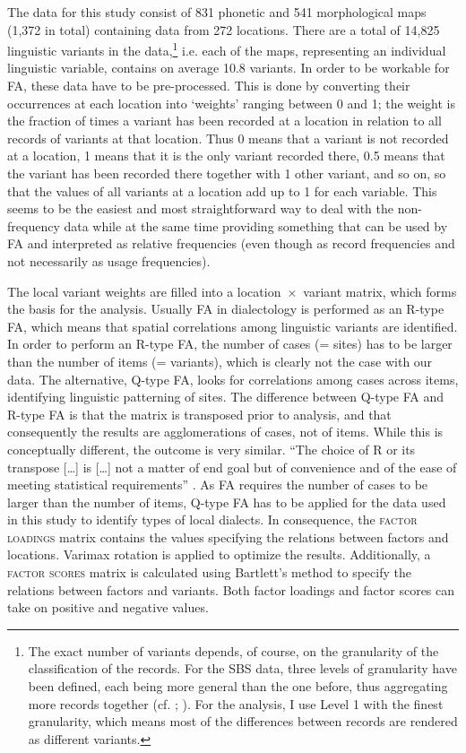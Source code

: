 \documentclass[output=paper]{LSP/langsci}
\begin{document}
The data for this study consist of 831 phonetic and 541 morphological maps (1,372 in total) containing data from 272 locations. There are a total of 14,825 linguistic variants in the data,\footnote{The exact number of variants depends, of course, on the granularity of the classification of the records. For the SBS data, three levels of granularity have been defined, each being more general than the one before, thus aggregating more records together (cf. \citealt[75--78]{pickl_probabilistische_2013}; \citealt[47--48]{proll_raumvariation_2015}). For the analysis, I use Level 1 with the finest granularity, which means most of the differences between records are rendered as different variants.} i.e. each of the maps, representing an individual linguistic variable, contains on average 10.8 variants. In order to be workable for FA, these data have to be pre-processed. This is done by converting their occurrences at each location into ‘weights’ ranging between 0 and 1; the weight is the fraction of times a variant has been recorded at a location in relation to all records of variants at that location. Thus 0 means that a variant is not recorded at a location, 1 means that it is the only variant recorded there, 0.5 means that the variant has been recorded there together with 1 other variant, and so on, so that the values of all variants at a location add up to 1 for each variable. This seems to be the easiest and most straightforward way to deal with the non-frequency data while at the same time providing something that can be used by FA and interpreted as relative frequencies (even though as record frequencies and not necessarily as usage frequencies). 

The local variant weights are filled into a location~×~variant matrix, which forms the basis for the analysis. Usually FA in dialectology is performed as an R-type FA, which means that spatial correlations among linguistic variants are identified. In order to perform an R-type FA, the number of cases (= sites) has to be larger than the number of items (= variants), which is clearly not the case with our data. The alternative, Q-type FA, looks for correlations among cases across items, identifying linguistic patterning of sites. The difference between Q-type FA and R-type FA is that the matrix is transposed prior to analysis, and that consequently the results are agglomerations of cases, not of items. While this is conceptually different, the outcome is very similar. “The choice of R or its transpose […] is […] not a matter of end goal but of convenience and of the ease of meeting statistical requirements” \citep[326]{cattell_scientific_1978}. As FA requires the number of cases to be larger than the number of items, Q-type FA has to be applied for the data used in this study to identify types of local dialects. In consequence, the \textsc{factor loadings} matrix contains the values specifying the relations between factors and locations. Varimax rotation is applied to optimize the results. Additionally, a \textsc{factor scores} matrix is calculated using Bartlett’s method to specify the relations between factors and variants. Both factor loadings and factor scores can take on positive and negative values.
\end{document}
